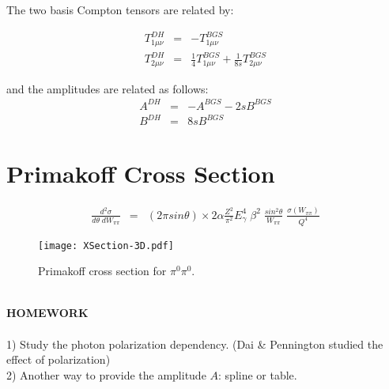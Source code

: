 \documentclass[12pt,epsfig]{article}
\newcommand{\bea}{\begin{eqnarray}}
\newcommand{\eea}{\end{eqnarray}}
\begin{document}
The two basis Compton tensors are related by:

\bea
T^{DH}_{1\mu\nu}&=&-T^{BGS}_{1\mu\nu}\nonumber\\
T^{DH}_{2\mu\nu}&=&\frac 14 T^{BGS}_{1\mu\nu}+\frac 1{8s}  T^{BGS}_{2\mu\nu}
\eea

and the amplitudes are related as follows:
\bea
A^{DH}&=&-A^{BGS}-2 s B^{BGS}\nonumber\\
B^{DH}&=&8 s B^{BGS}
\eea

\section{ Primakoff Cross Section }

\bea
\frac{d^2\sigma}{d\theta\;d W_{\pi\pi}}&=&
(2 \pi sin\theta)\times 2 \alpha \frac{Z^2}{
\pi^2} E_\gamma^4\; \beta^2 \; \frac{sin^2\theta}{
W_{\pi\pi}}  \; \frac{\sigma(W_{\pi\pi})}{
Q^4} 
\eea
\begin{figure}
	\begin{center}
			{\texttt{[image: XSection-3D.pdf]}}\\
		\caption{Primakoff cross section for $\pi^0\pi^0$.}
		\end{center}
\end{figure}\\
\newpage
{\bf HOMEWORK }\\\\

1) Study the photon polarization dependency. (Dai \& Pennington studied the effect of polarization)\\

2) Another way to provide the amplitude $A$: spline or table.\\\\


 
\end{document}
